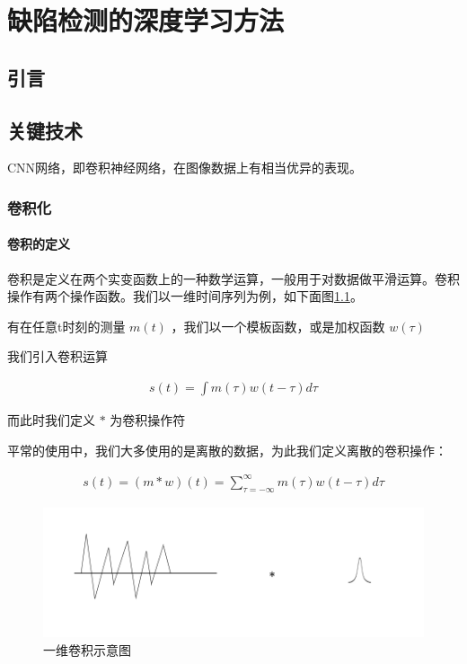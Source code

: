 \chapter{缺陷检测的深度学习方法}
\section{引言}

\section{关键技术}
CNN网络，即卷积神经网络，在图像数据上有相当优异的表现。

\subsection{卷积化}

\subsubsection{卷积的定义}

卷积是定义在两个实变函数上的一种数学运算，一般用于对数据做平滑运算。卷积操作有两个操作函数。我们以一维时间序列为例，如下面图\ref{fig:con-1D}。

有在任意t时刻的测量 $ m(t) $ ，我们以一个模板函数，或是加权函数 $ w(\tau) $

我们引入卷积运算

\begin{eqnarray}
    s(t) =  \int m(\tau)w(t-\tau)d\tau
\end{eqnarray}

而此时我们定义 $ \ast $ 为卷积操作符

平常的使用中，我们大多使用的是离散的数据，为此我们定义离散的卷积操作：

\begin{eqnarray}
    s(t) = (m \ast w)(t) = \sum^{\infty}_{\tau = -\infty} m(\tau)w(t-\tau)d\tau
\end{eqnarray}

\begin{figure}[!tbp]
    \centering
    \includegraphics[width=\textwidth]{figures/con-1D.png}
    \caption{一维卷积示意图}
    \vspace{-1em}
    \label{fig:con-1D}
\end{figure}

